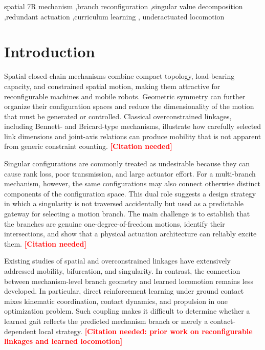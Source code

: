 ﻿\documentclass[a4paper,fleqn]{cas-sc}
\newcommand{\missing}[1]{\textcolor{red}{\textbf{[#1]}}}
\begin{document}
\begin{keywords}
spatial 7R mechanism \sep branch reconfiguration \sep singular value
decomposition \sep redundant actuation \sep curriculum learning \sep
underactuated locomotion
\end{keywords}

\maketitle

\section{Introduction}

Spatial closed-chain mechanisms combine compact topology, load-bearing
capacity, and constrained spatial motion, making them attractive for
reconfigurable machines and mobile robots. Geometric symmetry can further
organize their configuration spaces and reduce the dimensionality of the
motion that must be generated or controlled. Classical overconstrained
linkages, including Bennett- and Bricard-type mechanisms, illustrate how
carefully selected link dimensions and joint-axis relations can produce
mobility that is not apparent from generic constraint counting.
\missing{Citation needed}

Singular configurations are commonly treated as undesirable because they can
cause rank loss, poor transmission, and large actuator effort. For a
multi-branch mechanism, however, the same configurations may also connect
otherwise distinct components of the configuration space. This dual role
suggests a design strategy in which a singularity is not traversed
accidentally but used as a predictable gateway for selecting a motion branch.
The main challenge is to establish that the branches are genuine
one-degree-of-freedom motions, identify their intersections, and show that a
physical actuation architecture can reliably excite them.
\missing{Citation needed}

Existing studies of spatial and overconstrained linkages have extensively
addressed mobility, bifurcation, and singularity. In contrast, the connection
between mechanism-level branch geometry and learned locomotion remains less
developed. In particular, direct reinforcement learning under ground contact
mixes kinematic coordination, contact dynamics, and propulsion in one
optimization problem. Such coupling makes it difficult to determine whether a
learned gait reflects the predicted mechanism branch or merely a
contact-dependent local strategy.
\missing{Citation needed: prior work on reconfigurable linkages and learned locomotion}
\end{document}
